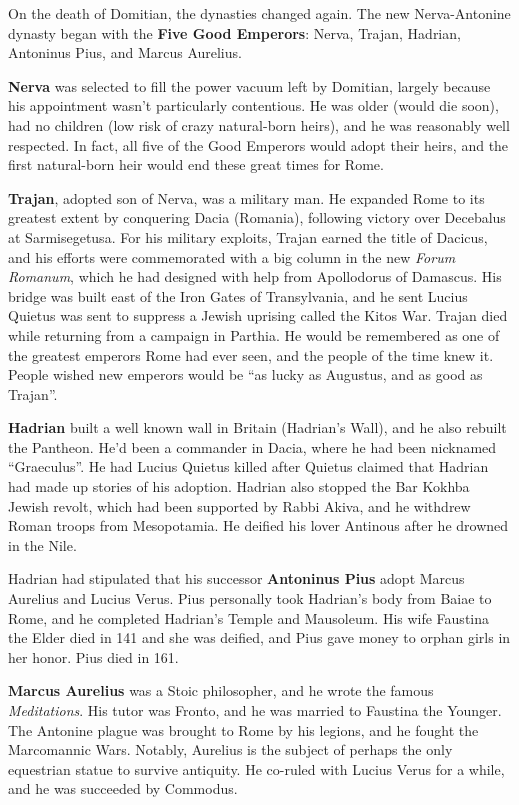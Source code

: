 On the death of Domitian, the dynasties changed again.
The new Nerva-Antonine dynasty began with the \textbf{Five Good Emperors}:
Nerva, Trajan, Hadrian, Antoninus Pius, and Marcus Aurelius.

\textbf{Nerva} was selected to fill the power vacuum left by Domitian,
largely because his appointment wasn't particularly contentious.
He was older (would die soon), had no children (low risk of crazy natural-born heirs),
and he was reasonably well respected.
In fact, all five of the Good Emperors would adopt their heirs,
and the first natural-born heir would end these great times for Rome.

\textbf{Trajan}, adopted son of Nerva, was a military man.
He expanded Rome to its greatest extent by conquering Dacia (Romania),
following victory over Decebalus at Sarmisegetusa.
For his military exploits, Trajan earned the title of Dacicus,
and his efforts were commemorated with a big column in the new \textit{Forum Romanum},
which he had designed with help from Apollodorus of Damascus.
His bridge was built east of the Iron Gates of Transylvania,
and he sent Lucius Quietus was sent to suppress a Jewish uprising called the Kitos War.
Trajan died while returning from a campaign in Parthia.
He would be remembered as one of the greatest emperors Rome had ever seen,
and the people of the time knew it.
People wished new emperors would be ``as lucky as Augustus, and as good as Trajan''.

\textbf{Hadrian} built a well known wall in Britain (Hadrian's Wall), and he also rebuilt the Pantheon.
He'd been a commander in Dacia, where he had been nicknamed ``Graeculus''.
He had Lucius Quietus killed after Quietus claimed that Hadrian had made up stories of his adoption.
Hadrian also stopped the Bar Kokhba Jewish revolt, which had been supported by Rabbi Akiva,
and he withdrew Roman troops from Mesopotamia.
He deified his lover Antinous after he drowned in the Nile.

Hadrian had stipulated that his successor \textbf{Antoninus Pius} adopt Marcus Aurelius and Lucius Verus.
Pius personally took Hadrian's body from Baiae to Rome, and he completed Hadrian's Temple and Mausoleum.
His wife Faustina the Elder died in 141 and she was deified, and Pius gave money to orphan girls in her honor.
Pius died in 161.

\textbf{Marcus Aurelius} was a Stoic philosopher, and he wrote the famous \textit{Meditations}.
His tutor was Fronto, and he was married to Faustina the Younger.
The Antonine plague was brought to Rome by his legions, and he fought the Marcomannic Wars.
Notably, Aurelius is the subject of perhaps the only equestrian statue to survive antiquity.
He co-ruled with Lucius Verus for a while, and he was succeeded by Commodus.

